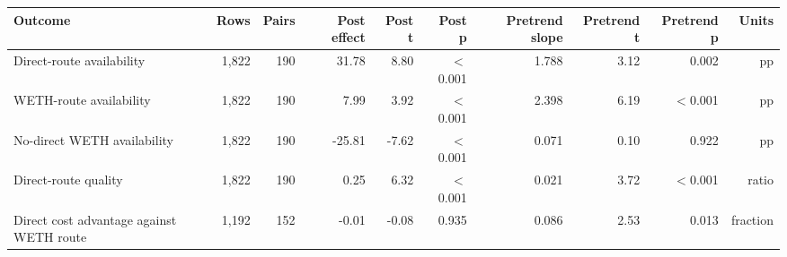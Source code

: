 \begin{tabular}{lrrrrrrrrr}
\toprule
Outcome & Rows & Pairs & Post effect & Post t & Post p & Pretrend slope & Pretrend t & Pretrend p & Units \\
\midrule
Direct-route availability & 1,822 & 190 & 31.78 & 8.80 & \ensuremath{<}0.001 & 1.788 & 3.12 & 0.002 & pp \\
WETH-route availability & 1,822 & 190 & 7.99 & 3.92 & \ensuremath{<}0.001 & 2.398 & 6.19 & \ensuremath{<}0.001 & pp \\
No-direct WETH availability & 1,822 & 190 & -25.81 & -7.62 & \ensuremath{<}0.001 & 0.071 & 0.10 & 0.922 & pp \\
Direct-route quality & 1,822 & 190 & 0.25 & 6.32 & \ensuremath{<}0.001 & 0.021 & 3.72 & \ensuremath{<}0.001 & ratio \\
Direct cost advantage against WETH route & 1,192 & 152 & -0.01 & -0.08 & 0.935 & 0.086 & 2.53 & 0.013 & fraction \\
\bottomrule
\end{tabular}
